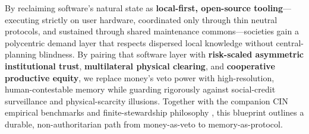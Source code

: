 \documentclass[11pt]{article}
\begin{document}
By reclaiming software's natural state as \textbf{local-first, open-source tooling}---executing strictly on user hardware, coordinated only through thin neutral protocols, and sustained through shared maintenance commons---societies gain a polycentric demand layer that respects dispersed local knowledge without central-planning blindness. By pairing that software layer with \textbf{risk-scaled asymmetric institutional trust}, \textbf{multilateral physical clearing}, and \textbf{cooperative productive equity}, we replace money's veto power with high-resolution, human-contestable memory while guarding rigorously against social-credit surveillance and physical-scarcity illusions. Together with the companion CIN empirical benchmarks and finite-stewardship philosophy \citep{baker2026cin}, this blueprint outlines a durable, non-authoritarian path from money-as-veto to memory-as-protocol.

\FloatBarrier
{\small
\setlength{\bibsep}{3.5pt plus 0.5pt}


}
\end{document}
